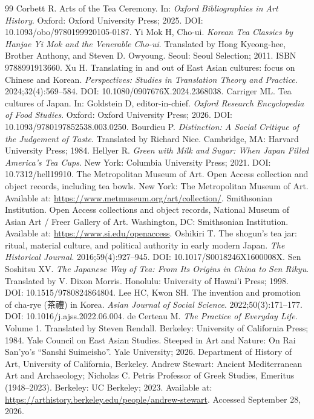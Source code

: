 \documentclass[numbers]{IntechOpen-Book}
\newcommand{\zh}[1]{{\CJKfontspec{Noto Serif CJK SC}\upshape #1}}
\begin{document}
\begin{backmatter}
\begin{thebibliography}{99}
 Corbett R. Arts of the Tea Ceremony. In: \textit{Oxford Bibliographies in Art History}. Oxford: Oxford University Press; 2025. DOI: 10.1093/obo/9780199920105-0187.
 Yi Mok H, Cho-ui. \textit{Korean Tea Classics by Hanjae Yi Mok and the Venerable Cho-ui}. Translated by Hong Kyeong-hee, Brother Anthony, and Steven D. Owyoung. Seoul: Seoul Selection; 2011. ISBN 9788991913660.
 Xu H. Translating in and out of East Asian cultures: focus on Chinese and Korean. \textit{Perspectives: Studies in Translation Theory and Practice}. 2024;32(4):569--584. DOI: 10.1080/0907676X.2024.2368038. Carriger ML. Tea cultures of Japan. In: Goldstein D, editor-in-chief. \textit{Oxford Research Encyclopedia of Food Studies}. Oxford: Oxford University Press; 2026. DOI: 10.1093/9780197852538.003.0250.
 Bourdieu P. \textit{Distinction: A Social Critique of the Judgement of Taste}. Translated by Richard Nice. Cambridge, MA: Harvard University Press; 1984.
 Hellyer R. \textit{Green with Milk and Sugar: When Japan Filled America's Tea Cups}. New York: Columbia University Press; 2021. DOI: 10.7312/hell19910.
 The Metropolitan Museum of Art. Open Access collection and object records, including tea bowls. New York: The Metropolitan Museum of Art. Available at: \url{https://www.metmuseum.org/art/collection/}.
 Smithsonian Institution. Open Access collections and object records, National Museum of Asian Art / Freer Gallery of Art. Washington, DC: Smithsonian Institution. Available at: \url{https://www.si.edu/openaccess}.
 Oshikiri T. The shogun's tea jar: ritual, material culture, and political authority in early modern Japan. \textit{The Historical Journal}. 2016;59(4):927--945. DOI: 10.1017/S0018246X1600008X.
 Sen Soshitsu XV. \textit{The Japanese Way of Tea: From Its Origins in China to Sen Rikyu}. Translated by V. Dixon Morris. Honolulu: University of Hawai'i Press; 1998. DOI: 10.1515/9780824864804.
 Lee HC, Kwon SH. The invention and promotion of cha-rye (\zh{茶禮}) in Korea. \textit{Asian Journal of Social Science}. 2022;50(3):171--177. DOI: 10.1016/j.ajss.2022.06.004.
 de Certeau M. \textit{The Practice of Everyday Life}. Volume 1. Translated by Steven Rendall. Berkeley: University of California Press; 1984.
 Yale Council on East Asian Studies. Steeped in Art and Nature: On Rai San'yo's ``Sanshi Suimeisho''. Yale University; 2026.
 Department of History of Art, University of California, Berkeley. Andrew Stewart: Ancient Mediterranean Art and Archaeology; Nicholas C. Petris Professor of Greek Studies, Emeritus (1948--2023). Berkeley: UC Berkeley; 2023. Available at: \url{https://arthistory.berkeley.edu/people/andrew-stewart}. Accessed September 28, 2026.

\end{thebibliography}
\end{backmatter}
\end{document}
